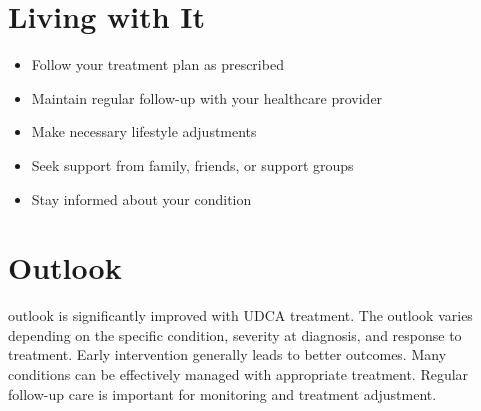 \section{Living with It}
\begin{itemize}[noitemsep]
  \item Follow your treatment plan as prescribed
  \item Maintain regular follow-up with your healthcare provider
  \item Make necessary lifestyle adjustments
  \item Seek support from family, friends, or support groups
  \item Stay informed about your condition
\end{itemize}
\section{Outlook}
outlook is significantly improved with UDCA treatment. The outlook varies depending on the specific condition, severity at diagnosis, and response to treatment. Early intervention generally leads to better outcomes. Many conditions can be effectively managed with appropriate treatment. Regular follow-up care is important for monitoring and treatment adjustment.
